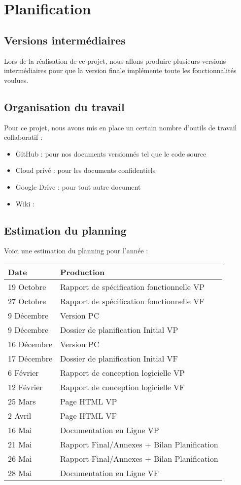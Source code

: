 \section{Planification}
\subsection{Versions intermédiaires}
Lors de la réalisation de ce projet, nous allons produire plusieurs versions intermédiaires pour que la version finale implémente toute les fonctionnalités voulues.
\subsection{Organisation du travail}
Pour ce projet, nous avons mis en place un certain nombre d'outils de travail collaboratif :

\begin{itemize}
  \item GitHub : pour nos documents versionnés tel que le code source
  \item Cloud privé : pour les documents confidentiels
  \item Google Drive : pour tout autre document
  \item Wiki : 
\end{itemize}


\subsection{Estimation du planning}
Voici une estimation du planning pour l'année :

\begin{tabular}{|l|l|}
\hline
  Date &
  Production \\
\hline
  19 Octobre &
  Rapport de spécification fonctionnelle VP \\
\hline
  27 Octobre &
  Rapport de spécification fonctionnelle VF \\
\hline
  9 Décembre &
  Version PC \textnumero1 \\
\hline
  9 Décembre &
  Dossier de planification Initial VP \\
\hline
  16 Décembre &
  Version PC \textnumero2 \\
\hline
  17 Décembre &
  Dossier de planification Initial VF \\
\hline
  6 Février &
  Rapport de conception logicielle VP \\
\hline
  12 Février &
  Rapport de conception logicielle VF \\
\hline
  25 Mars &
  Page HTML VP \\
\hline
  2 Avril &
  Page HTML VF \\
\hline
  16 Mai &
  Documentation en Ligne VP \\
\hline
  21 Mai &
  Rapport Final/Annexes + Bilan Planification \\
\hline
  26 Mai &
  Rapport Final/Annexes + Bilan Planification \\
\hline
  28 Mai &
  Documentation en Ligne VF \\
\hline
\end{tabular}